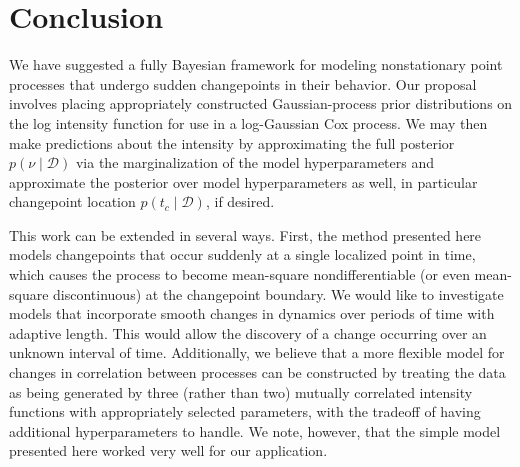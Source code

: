\documentclass{article}
\newcommand{\cm}[1]{\mathcal{#1}}
\newcommand{\data}{\cm{D}}
\newcommand{\given}{\mid}
\begin{document}
\section{Conclusion}

We have suggested a fully Bayesian framework for modeling
nonstationary point processes that undergo sudden changepoints in
their behavior.  Our proposal involves placing appropriately
constructed Gaussian-process prior distributions on the log intensity
function for use in a log-Gaussian Cox process.  We may then make
predictions about the intensity by approximating the full posterior
$p(\nu \given \data)$ via the marginalization of the model
hyperparameters and approximate the posterior over model
hyperparameters as well, in particular changepoint location $p(t_c
\given \data)$, if desired.

This work can be extended in several ways.  First, the method
presented here models changepoints that occur suddenly at a single
localized point in time, which causes the process to become
mean-square nondifferentiable (or even mean-square discontinuous) at
the changepoint boundary.  We would like to investigate models that
incorporate smooth changes in dynamics over periods of time with
adaptive length.  This would allow the discovery of a change occurring
over an unknown interval of time.  Additionally, we believe that a
more flexible model for changes in correlation between processes can
be constructed by treating the data as being generated by three
(rather than two) mutually correlated intensity functions with
appropriately selected parameters, with the tradeoff of having
additional hyperparameters to handle.  We note, however, that the
simple model presented here worked very well for our application.


\end{document}
